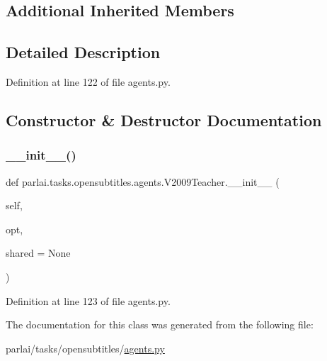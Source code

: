 \subsection*{Additional Inherited Members}


\subsection{Detailed Description}


Definition at line 122 of file agents.\+py.



\subsection{Constructor \& Destructor Documentation}
\mbox{\label{classparlai_1_1tasks_1_1opensubtitles_1_1agents_1_1V2009Teacher_ad42d78a9d6ecfb02d6807452e3648fbe}} 
\subsubsection{\texorpdfstring{\+\_\+\+\_\+init\+\_\+\+\_\+()}{\_\_init\_\_()}}
{\footnotesize\ttfamily def parlai.\+tasks.\+opensubtitles.\+agents.\+V2009\+Teacher.\+\_\+\+\_\+init\+\_\+\+\_\+ (\begin{DoxyParamCaption}\item[{}]{self,  }\item[{}]{opt,  }\item[{}]{shared = {\ttfamily None} }\end{DoxyParamCaption})}



Definition at line 123 of file agents.\+py.



The documentation for this class was generated from the following file\+:\begin{DoxyCompactItemize}
\item 
parlai/tasks/opensubtitles/\hyperlink{parlai_2tasks_2opensubtitles_2agents_8py}{agents.\+py}\end{DoxyCompactItemize}
